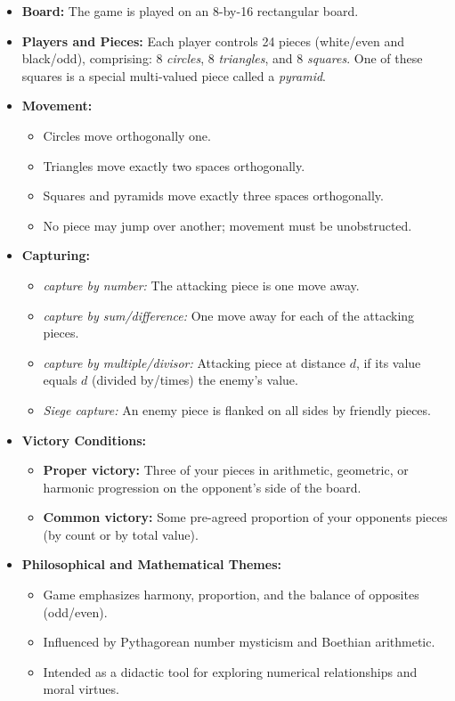 \documentclass[14pt]{extarticle}
\begin{document}
\begin{itemize}
    \item \textbf{Board:} The game is played on an 8-by-16 rectangular board. 

    \item \textbf{Players and Pieces:} Each player controls 24 pieces (white/even and black/odd), comprising:
      8 \emph{circles}, 8 \emph{triangles}, and 8 \emph{squares}. One of these squares is a
      special multi-valued piece called a {\it pyramid}. 

    \item \textbf{Movement:}
    \begin{itemize}
        \item Circles move orthogonally one.
        \item Triangles move exactly two spaces orthogonally.
        \item Squares and pyramids move exactly three spaces orthogonally.
        \item No piece may jump over another; movement must be unobstructed.
    \end{itemize}

    \item \textbf{Capturing:}
    \begin{itemize}
        \item \emph{capture by number:} The attacking piece is one move away.
        \item \emph{capture by sum/difference:} One move away for each of the attacking pieces.
        \item \emph{capture by multiple/divisor:} Attacking piece at distance $d$, if its value
          equals $d$ (divided by/times) the enemy’s value.
        \item \emph{Siege capture:} An enemy piece is flanked on all sides by friendly pieces.
    \end{itemize}

    \item \textbf{Victory Conditions:}
    \begin{itemize}
        \item \textbf{Proper victory:} 
          Three of your pieces in arithmetic, geometric, or harmonic progression
          on the opponent's side of the board.
        \item \textbf{Common victory:} Some pre-agreed proportion of
          your opponents pieces (by count or by total value).
\end{itemize}
           

    \item \textbf{Philosophical and Mathematical Themes:}
    \begin{itemize}
        \item Game emphasizes harmony, proportion, and the balance of opposites (odd/even).
        \item Influenced by Pythagorean number mysticism and Boethian arithmetic.
        \item Intended as a didactic tool for exploring numerical relationships and moral virtues.
    \end{itemize}
\end{itemize}
\end{document}
